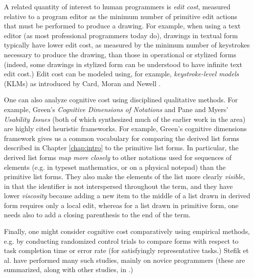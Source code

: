 A related quantity of interest to human programmers is \emph{edit cost}, measured relative to a program editor as the minimum number of primitive edit actions that must be performed to produce a drawing. For example, when using a text editor (as most professional programmers today do), drawings in textual form typically have lower edit cost, as measured by the minimum number of keystrokes necessary to produce the drawing, than those in operational or stylized forms (indeed, some drawings in stylized form can be understood to have infinite text edit cost.) Edit cost can be modeled using, for example, \emph{keystroke-level models} (KLMs) as introduced by Card, Moran and Newell \cite{journals/cacm/CardMN80}.%

One can also analyze cognitive cost using disciplined qualitative methods. For example, Green's \emph{Cognitive Dimensions of Notations} \cite{Green89,green1996usability} and Pane and Myers' \emph{Usability Issues} \cite{pane1996usability} (both of which synthesized much of the earlier work in the area) are highly cited heuristic frameworks. For example, Green's cognitive dimensions framework gives us a common vocabulary for  comparing the derived list forms described in Chapter \ref{chap:intro} to the primitive list forms. In particular, the derived list forms \emph{map more closely} to other notations used for sequences of elements (e.g. in typeset mathematics, or on a physical notepad) than the primitive list forms. They also make the elements of the list more clearly \emph{visible}, in that the identifier  is not interspersed throughout the term, and they have lower \emph{viscosity} because adding a new item to the middle of a list drawn in derived form requires only a local edit, whereas for a list drawn in primitive form, one needs also to add a closing parenthesis to the end of the term.

Finally, one might consider cognitive cost comparatively using empirical methods, e.g. by conducting randomized control trials to compare forms with respect to task completion time or error rate (for satisfyingly representative tasks.) Stefik et al. have performed many such studies, mainly on novice programmers (these are summarized, along with other studies, in \cite{journals/jeric/StefikS13}.)

